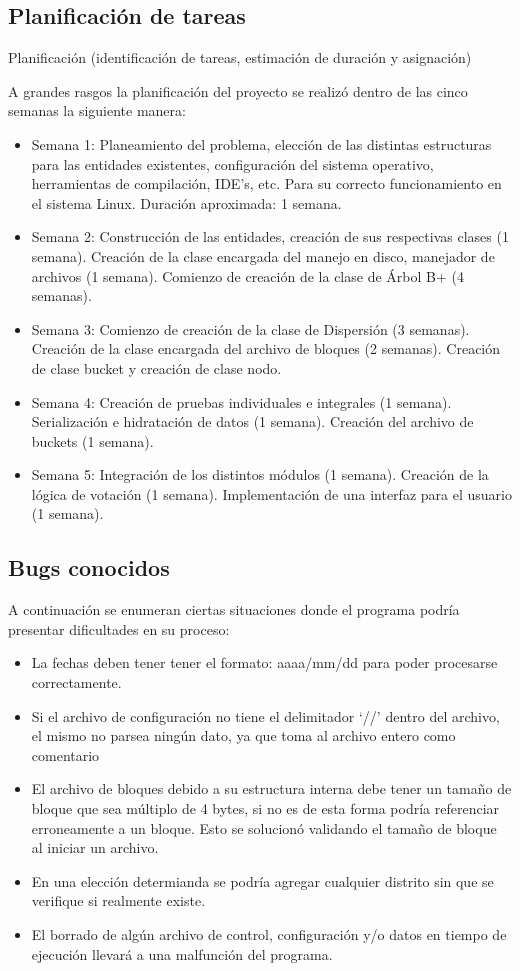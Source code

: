 \documentclass[a4paper,10pt]{article}
\begin{document}
\subsection{Planificación de tareas}
Planificación (identificación de tareas, estimación de duración y asignación)

A grandes rasgos la planificación del proyecto se realizó dentro de las cinco semanas la siguiente manera:

\begin{itemize}
\item Semana 1: Planeamiento del problema, elección de las distintas estructuras para las entidades existentes, configuración del sistema operativo, herramientas de compilación, IDE's, etc. Para su correcto funcionamiento en el sistema Linux. Duración aproximada: 1 semana.
\item Semana 2: Construcción de las entidades, creación de sus respectivas clases (1 semana). Creación de la clase encargada del manejo en disco, manejador de archivos (1 semana). Comienzo de creación de la clase de Árbol B+ (4 semanas).
\item Semana 3: Comienzo de creación de la clase de Dispersión (3 semanas). Creación de la clase encargada del archivo de bloques (2 semanas). Creación de clase bucket y creación de clase nodo.
\item Semana 4: Creación de pruebas individuales e integrales (1 semana). Serialización e hidratación de datos (1 semana). Creación del archivo de buckets (1 semana).
\item Semana 5: Integración de los distintos módulos (1 semana). Creación de la lógica de votación (1 semana). Implementación de una interfaz para el usuario (1 semana).
\end{itemize}


\subsection{Bugs conocidos}

A continuación se enumeran ciertas situaciones donde el programa podría presentar dificultades en su proceso:

\begin{itemize}
\item La fechas deben tener tener el formato: aaaa/mm/dd para poder procesarse correctamente.
\item Si el archivo de configuración no tiene el delimitador `//' dentro del archivo, el mismo no parsea ningún dato, ya que toma al archivo entero como comentario
\item El archivo de bloques debido a su estructura interna debe tener un tamaño de bloque que sea múltiplo de 4 bytes, si no es de esta forma podría referenciar erroneamente a un bloque. Esto se solucionó validando el tamaño de bloque al iniciar un archivo.
\item En una elección determianda se podría agregar cualquier distrito sin que se verifique si realmente existe.
\item El borrado de algún archivo de control, configuración y/o datos en tiempo de ejecución llevará a una malfunción del programa.
\end{itemize}
\end{document}
